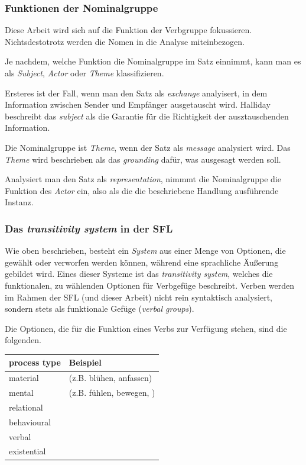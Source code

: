 \subsubsection{Funktionen der Nominalgruppe}

Diese Arbeit wird sich auf die Funktion der Verbgruppe fokussieren. Nichtsdestotrotz werden die Nomen in die Analyse miteinbezogen.

Je nachdem, welche Funktion die Nominalgruppe im Satz einnimmt, kann man es als \textit{Subject}, \textit{Actor} oder \textit{Theme} klassifizieren.

Ersteres ist der Fall, wenn man den Satz als \textit{exchange} analyisert, in dem Information zwischen Sender und Empfänger ausgetauscht wird. Halliday beschreibt das \textit{subject} als die Garantie für die Richtigkeit der ausztauschenden Information.

Die Nominalgruppe ist \textit{Theme}, wenn der Satz als \textit{message} analysiert wird. Das \textit{Theme} wird beschrieben als das \textit{grounding} dafür, was ausgesagt werden soll.

Analysiert man den Satz als \textit{representation}, nimmmt die Nominalgruppe die Funktion des \textit{Actor} ein, also als die die beschriebene Handlung ausführende Instanz.



\subsubsection{Das \textit{transitivity system} in der SFL}

Wie oben beschrieben, besteht ein \textit{System} aus einer Menge von Optionen, die gewählt oder verworfen werden können, während eine sprachliche Äußerung gebildet wird. Eines dieser Systeme ist das \textit{transitivity system}, welches die funktionalen, zu wählenden Optionen für Verbgefüge beschreibt. Verben werden im Rahmen der SFL (und dieser Arbeit) nicht rein syntaktisch analysiert, sondern stets als funktionale Gefüge (\textit{verbal groups}).

Die Optionen, die für die Funktion eines Verbs zur Verfügung stehen, sind die folgenden.

\begin{table}
\centering
\begin{tabular}{ll}
\toprule
process type & Beispiel\\
\midrule
material & (z.B. blühen, anfassen)\\
mental & (z.B. fühlen, bewegen, )\\
relational & \\
behavioural & \\
verbal & \\
existential & \\
\bottomrule
\end{tabular}
\end{table}



